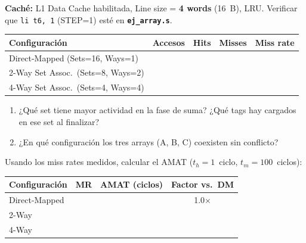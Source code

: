\documentclass[12pt, a4paper]{article}
\newcommand{\archivo}[1]{\texttt{\textbf{#1}}}
\begin{document}
\begin{actividad}
    \textbf{Caché:} L1 Data Cache habilitada, Line size = \textbf{4 words} (16~B), LRU.
    Verificar que \texttt{li t6, 1} (STEP=1) esté en \archivo{ej\_array.s}.

    \vspace{0.3cm}
    \begin{center}
    \renewcommand{\arraystretch}{1.8}
    \begin{tabular}{|l|c|c|c|c|}
        \hline
        \textbf{Configuración} & \textbf{Accesos} & \textbf{Hits} & \textbf{Misses} & \textbf{Miss rate} \\
        \hline
        Direct-Mapped (Sets=16, Ways=1) & & & & \\
        \hline
        2-Way Set Assoc.\ (Sets=8, Ways=2) & & & & \\
        \hline
        4-Way Set Assoc.\ (Sets=4, Ways=4) & & & & \\
        \hline
    \end{tabular}
    \end{center}

    \begin{enumerate}
        \item ¿Qué set tiene mayor actividad en la fase de suma?
              ¿Qué tags hay cargados en ese set al finalizar?
        \item ¿En qué configuración los tres arrays (A, B, C) coexisten sin conflicto?
    \end{enumerate}

    Usando los miss rates medidos, calcular el AMAT
    ($t_h = 1$~ciclo, $t_m = 100$~ciclos):

    \vspace{0.2cm}
    \begin{center}
    \renewcommand{\arraystretch}{1.8}
    \begin{tabular}{|l|c|c|c|}
        \hline
        \textbf{Configuración} & \textbf{MR} & \textbf{AMAT (ciclos)} & \textbf{Factor vs.\ DM} \\
        \hline
        Direct-Mapped & & & 1.0$\times$ \\
        \hline
        2-Way & & & \\
        \hline
        4-Way & & & \\
        \hline
    \end{tabular}
    \end{center}
\end{actividad}
\end{document}
